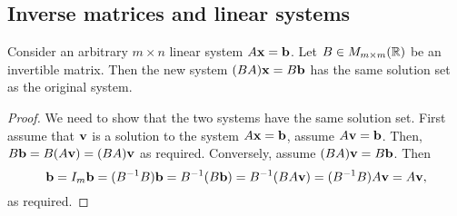 \documentclass[10pt, a4paper]{article}
\begin{document}
\subsection{Inverse matrices and linear systems}
\begin{lemma}\label{pre_linalg_lem_solsetsam}
    Consider an arbitrary $m \times n$ linear system $A\mathbf{x} = \mathbf{b}$.
    Let $B \in M_{m \times m}(\mathbb{R})$ be an invertible matrix.
    Then the new system $(BA)\mathbf{x} = B\mathbf{b}$ has the same solution set as the original system.
    \begin{proof}
        We need to show that the two systems have the same solution set.
        First assume that $\mathbf{v}$ is a solution to the system $A\mathbf{x} = \mathbf{b}$, assume $A\mathbf{v} = \mathbf{b}$.
        Then, $B\mathbf{b} = B(A\mathbf{v}) = (BA)\mathbf{v}$ as required.
        Conversely, assume $(BA)\mathbf{v} = B\mathbf{b}$. Then
        \[
        \mathbf{b} = I_m\mathbf{b} = (B ^ {-1}B)\mathbf{b} = B ^ {-1}(B\mathbf{b}) = B ^ {-1}(BA\mathbf{v}) = (B ^ {-1} B) A\mathbf{v} = A\mathbf{v},
        \]
        as required.
    \end{proof}
\end{lemma}
\end{document}
